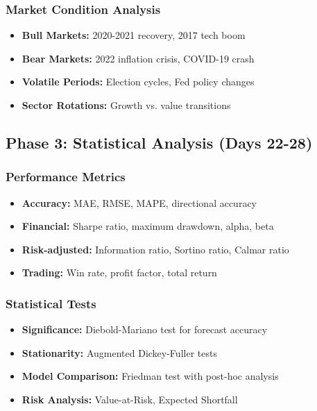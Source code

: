 \documentclass[11pt]{article}
\begin{document}
\subsubsection{Market Condition Analysis}
\begin{itemize}
    \item \textbf{Bull Markets:} 2020-2021 recovery, 2017 tech boom
    \item \textbf{Bear Markets:} 2022 inflation crisis, COVID-19 crash
    \item \textbf{Volatile Periods:} Election cycles, Fed policy changes
    \item \textbf{Sector Rotations:} Growth vs. value transitions
\end{itemize}

\subsection{Phase 3: Statistical Analysis (Days 22-28)}

\subsubsection{Performance Metrics}
\begin{itemize}
    \item \textbf{Accuracy:} MAE, RMSE, MAPE, directional accuracy
    \item \textbf{Financial:} Sharpe ratio, maximum drawdown, alpha, beta
    \item \textbf{Risk-adjusted:} Information ratio, Sortino ratio, Calmar ratio
    \item \textbf{Trading:} Win rate, profit factor, total return
\end{itemize}

\subsubsection{Statistical Tests}
\begin{itemize}
    \item \textbf{Significance:} Diebold-Mariano test for forecast accuracy
    \item \textbf{Stationarity:} Augmented Dickey-Fuller tests
    \item \textbf{Model Comparison:} Friedman test with post-hoc analysis
    \item \textbf{Risk Analysis:} Value-at-Risk, Expected Shortfall
\end{itemize}
\end{document}
